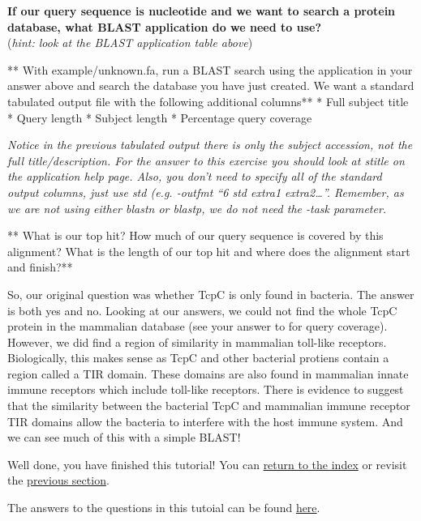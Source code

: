 \documentclass[11pt]{article}
\begin{document}
\textbf{If our query sequence is nucleotide and we want to search a
protein database, what BLAST application do we need to use?}\\
(\textit{hint: look at the BLAST application table above})

** With example/unknown.fa, run a BLAST search using the application in
your answer above and search the database you have just created. We want
a standard tabulated output file with the following additional columns**
* Full subject title * Query length * Subject length * Percentage query
coverage

\textit{Notice in the previous tabulated output there is only the subject
accession, not the full title/description. For the answer to this
exercise you should look at stitle on the application help page. Also,
you don't need to specify all of the standard output columns, just use
std (e.g. -outfmt ``6 std extra1 extra2\ldots{}''. Remember, as we are
not using either blastn or blastp, we do not need the -task parameter.}

** What is our top hit?\textbf{ } How much of our query sequence is
covered by this alignment?\textbf{ } What is the length of our top hit
and where does the alignment start and finish?**

So, our original question was whether TcpC is only found in bacteria.
The answer is both yes and no. Looking at our answers, we could not find
the whole TcpC protein in the mammalian database (see your answer to for
query coverage). However, we did find a region of similarity in
mammalian toll-like receptors. Biologically, this makes sense as TcpC
and other bacterial protiens contain a region called a TIR domain. These
domains are also found in mammalian innate immune receptors which
include toll-like receptors. There is evidence to suggest that the
similarity between the bacterial TcpC and mammalian immune receptor TIR
domains allow the bacteria to interfere with the host immune system. And
we can see much of this with a simple BLAST!

Well done, you have finished this tutorial! You can
\href{index.ipynb}{return to the index} or revisit the
\href{format_database.ipynb}{previous section}.

The answers to the questions in this tutoial can be found
\href{general_question_and_exercise_answers.ipynb}{here}.


\end{document}
